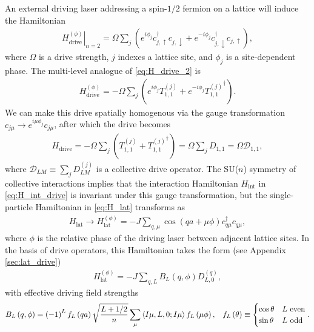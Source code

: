 \documentclass[nofootinbib,notitlepage,11pt]{revtex4-2}
\renewcommand{\t}{\text} %
\newcommand{\f}[2]{\dfrac{#1}{#2}} %
\newcommand{\p}[1]{\left(#1\right)} %
\newcommand{\bk}{\Braket} %
\newcommand{\1}{\mathds{1}}
\newcommand{\up}{\uparrow}
\newcommand{\dn}{\downarrow}
\newcommand{\D}{\mathcal{D}}
\begin{document}
An external driving laser addressing a spin-$1/2$ fermion on a lattice
will induce the Hamiltonian
\begin{align}
  \left. H_{\t{drive}}^{(\phi)} \right|_{n=2}
  = \Omega \sum_j
  \p{e^{i\phi_j} c_{j,\up}^\dag c_{j,\dn}
    + e^{-i\phi_j} c_{j,\dn}^\dag c_{j,\up}},
  \label{eq:H_drive_2}
\end{align}
where $\Omega$ is a drive strength, $j$ indexes a lattice site, and
$\phi_j$ is a site-dependent phase.  The multi-level analogue of
\eqref{eq:H_drive_2} is
\begin{align}
  H_{\t{drive}}^{(\phi)}
  = -\Omega \sum_j \p{e^{i\phi_j} T_{1,1}^{(j)}
    + e^{-i\phi_j} {T_{1,1}^{(j)}}^\dag}.
  \label{eq:H_drive}
\end{align}
We can make this drive spatially homogenous via the gauge
transformation $c_{j\mu} \to e^{i\mu\phi_j} c_{j\mu}$, after which the
drive becomes
\begin{align}
  H_{\t{drive}}
  = -\Omega \sum_j\p{T_{1,1}^{(j)} + {T_{1,1}^{(j)}}^\dag}
  = \Omega \sum_j D_{1,1}
  = \Omega \D_{1,1},
\end{align}
where $\D_{LM}\equiv\sum_jD_{LM}^{(j)}$ is a collective drive
operator.  The SU($n$) symmetry of collective interactions implies
that the interaction Hamiltonian $H_{\t{int}}$ in
\eqref{eq:H_int_drive} is invariant under this gauge transformation,
but the single-particle Hamiltonian in \eqref{eq:H_lat} transforms as
\begin{align}
  H_{\t{lat}}
  \to H_{\t{lat}}^{(\phi)}
  = -J \sum_{q,\mu} \cos\p{qa+\mu\phi} c_{q\mu}^\dag c_{q\mu},
  \label{eq:H_lat_SOC}
\end{align}
where $\phi$ is the relative phase of the driving laser between
adjacent lattice sites.  In the basis of drive operators, this
Hamiltonian takes the form (see Appendix \ref{sec:lat_drive})
\begin{align}
  H_{\t{lat}}^{(\phi)} = -J \sum_{q,L} B_L\p{q,\phi} D_{L,0}^{(q)},
  \label{eq:H_lat_drive}
\end{align}
with effective driving field strengths
\begin{align}
  B_L\p{q,\phi} = \p{-1}^L f_L\p{qa} \sqrt{\f{L+1/2}{n}}
  \sum_\mu \bk{I\mu,L,0;I\mu} f_L\p{\mu\phi},
  &&
  f_L\p{\theta} \equiv
  \begin{cases}
    \cos\theta & L~\t{even} \\
    \sin\theta & L~\t{odd}
  \end{cases}.
\end{align}
\end{document}
